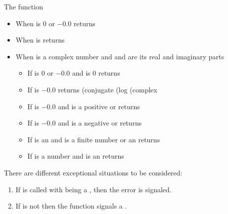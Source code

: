 \documentclass[../Comparisons-Predicates.tex]{subfiles}
\begin{document}
\noindent
The function 
\begin{itemize}
\item When  is $0$ or $-0.0$ returns
\item When  is  returns
\item When  is a complex number and  and
   are its real and imaginary parts
  \begin{itemize}
  \item If  is $0$ or $-0.0$ and
     is $0$ returns  \code{)))}
  \item If  is $-0.0$ returns \code
    {(conjugate (log (complex } 
  \item If  is $-0.0$ and  is a
    positive  or  returns
     
  \item If  is $-0.0$ and  is a
    negative  or  returns
     
  \item If  is an  and 
    is a finite number or an  returns
    \code{)))}
  \item If  is a  number and 
    is an  returns
     \code{)))}
  \end{itemize}
\end{itemize}


\DExceptional{}

There are different exceptional situations to be considered:
\begin{enumerate}
\item If  is called with
   being a , then the
   error is signaled.
\item If  is not \CL{}
   then the function  signals a
  .
\end{enumerate}
\end{document}
